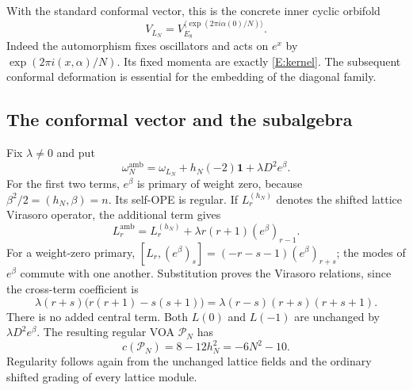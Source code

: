 \documentclass[11pt]{article}
\newcommand{\one}{\mathbf1}\newcommand{\D}{\mathcal D}\newcommand{\Dcat}{\mathcal D}
\numberwithin{equation}{section}
\begin{document}
With the standard conformal vector, this is the concrete inner cyclic orbifold
\begin{equation}\label{E:orbifold}
V_{L_N}=V_{E_8}^{\langle\exp(2\pi i\alpha(0)/N)\rangle}.
\end{equation}
Indeed the automorphism fixes oscillators and acts on $e^x$ by $\exp(2\pi i(x,\alpha)/N)$. Its fixed momenta are exactly \eqref{E:kernel}. The subsequent conformal deformation is essential for the embedding of the diagonal family.

\subsection{The conformal vector and the subalgebra}
Fix $\lambda\ne0$ and put
\begin{equation}\label{E:ambientomega}
\omega_N^{\mathrm{amb}}
=\omega_{L_N}+h_N(-2)\one+\lambda D^2e^\beta.
\end{equation}
For the first two terms, $e^\beta$ is primary of weight zero, because $\beta^2/2=(h_N,\beta)=n$. Its self-OPE is regular. If $L^{(h_N)}_r$ denotes the shifted lattice Virasoro operator, the additional term gives
\[
L^{\mathrm{amb}}_r=L^{(h_N)}_r+\lambda r(r+1)(e^\beta)_{r-1}.
\]
For a weight-zero primary, $[L_r,(e^\beta)_s]=(-r-s-1)(e^\beta)_{r+s}$; the modes of $e^\beta$ commute with one another. Substitution proves the Virasoro relations, since the cross-term coefficient is
\[
\lambda(r+s)\bigl(r(r+1)-s(s+1)\bigr)
=\lambda(r-s)(r+s)(r+s+1).
\]
There is no added central term. Both $L(0)$ and $L(-1)$ are unchanged by $\lambda D^2e^\beta$. The resulting regular VOA $\mathcal P_N$ has
\[
c(\mathcal P_N)=8-12h_N^2=-6N^2-10.
\]
Regularity follows again from the unchanged lattice fields and the ordinary shifted grading of every lattice module.
\end{document}
